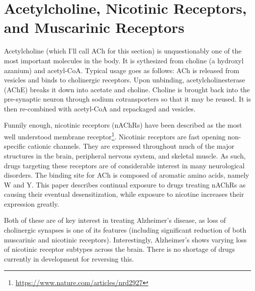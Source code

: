 \documentclass[12pt]{report}
\begin{document}
\section{Acetylcholine, Nicotinic Receptors, and Muscarinic Receptors}

Acetylcholine (which I'll call ACh for this section) is unquestionably one of the most important molecules in the body. It is sythesized from choline (a hydroxyl azanium) and acetyl-CoA. Typical usage goes as follows: ACh is released from vesicles and binds to cholinergic receptors. Upon unbinding, acetylcholinesterase (AChE) breaks it down into acetate and choline. Choline is brought back into the pre-synaptic neuron through sodium cotransporters so that it may be reused. It is then re-combined with acetyl-CoA and repackaged and vesicles.\newline 

Funnily enough, nicotinic receptors (nAChRs) have been described as the most well understood membrane receptor\footnote{\url{https://www.nature.com/articles/nrd2927}}. Nicotinic receptors are fast opening non-specific cationic channels.  They are expressed throughout much of the major structures in the brain, peripheral nervous system, and skeletal muscle. As such, drugs targeting these receptors are of considerable interest in many neurological disorders. The binding site for ACh is composed of aromatic amino acids, namely W and Y. This paper describes continual exposure to drugs treating nAChRs as causing their eventual desensitization, while exposure to nicotine increases their expression greatly.\newline

Both of these are of key interest in treating Alzheimer's disease, as loss of cholinergic synapses is one of its features (including significant reduction of both muscarinic and nicotinic receptors). Interestingly, Alzheimer's shows varying loss of nicotinic receptor subtypes across the brain. There is no shortage of drugs currently in development for reversing this.\newline
\end{document}
